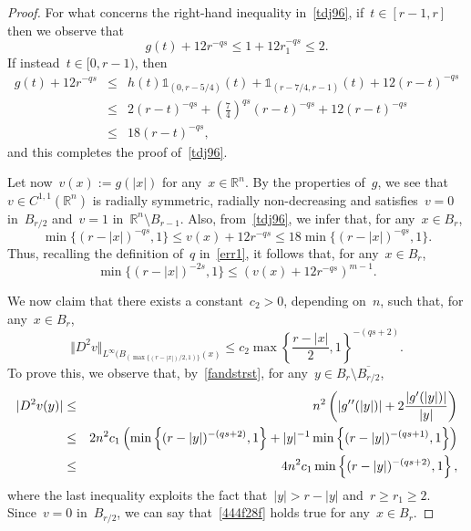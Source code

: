 \documentclass[10pt,a4paper]{amsart}
\numberwithin{equation}{section}
\newcommand{\R}{\mathbb{R}}
\begin{document}
\begin{proof}
For what concerns the right-hand inequality in~\eqref{tdj96}, if~$t \in[r-1,r]$ then we observe that
$$
g(t)+12r^{-qs} \leq 1+12 r_1^{-qs} \leq 2.
$$
If instead~$t \in[0,r-1)$, then
\begin{eqnarray*}
g(t) + 12 r^{-qs}&\leq & h(t) \mathds{1}_{(0,r-5/4)}(t) + \mathds{1}_{(r-7/4,r-1)}(t) +12 (r-t)^{-qs}\\
&\leq & 2 (r-t)^{-qs} +\left(\frac{7}{4}\right)^{qs} (r-t)^{-qs} +12 (r-t)^{-qs}\\
&\leq & 18 (r-t)^{-qs},
\end{eqnarray*}
and this completes the proof of~\eqref{tdj96}.

Let now~$v(x):= g(|x |)$ for any~$x \in \R^n$. By the properties of~$g$, we see that~$v \in C^{1,1}(\R^n)$ is radially symmetric, radially non-decreasing and satisfies~$v=0$ in~$B_{r/2}$ and~$v=1$ in~$\R^n \setminus B_{r-1}$. Also, from~\eqref{tdj96}, we infer that, for any~$x \in B_r$,
\begin{equation}\label{rtrc444}
\min\{(r-|x |)^{-qs},1 \} \leq v(x) + 12 r^{-qs} \leq 18  \min \{(r-|x |)^{-qs},1\} .
\end{equation}
Thus, recalling the definition of~$q$ in~\eqref{err1}, it follows that, for any~$x \in B_r$,
\begin{equation}\label{rtgy96}
\min\{(r-|x |)^{-2s},1 \} \leq ( v(x) + 12 r^{-qs} )^{m-1}.
\end{equation}

We now claim that there exists a constant~$c_2>0$, depending on~$n$, such that, for any~$x \in B_r$,
\begin{equation}\label{rtbtg3}
\Vert D^2 v \Vert_{L^{\infty}(B_{(\max\{(r-| x |)/2,1)\}}(x)} \leq c_2 \max \left\{ \frac{r -|x |}{2},1\right\}^{-(qs+2)}.
\end{equation}
To prove this, we observe that, by~\eqref{fandstrst}, for any~$y \in B_r \setminus \overline{B_{r/2}}$,
\begin{eqnarray}\label{444f28f}
| D^2 v(y) | &\leq & n^2 \left( |g\rq{}\rq{}(|y|)|+ 2 \frac{|g\rq{}(|y |)|}{|y |}\right) \notag\\
&\leq & 2n^2 c_1 \left( \min\left\{ (r-| y |)^{-(qs+2)},1 \right\} +| y |^{-1}\min\left\{ (r-|y |)^{-(qs+1)},1 \right\} \right) \notag\\
&\leq & 4n^2 c_1 \min\left\{ (r-|y |)^{-(qs+2)},1 \right\} ,
\end{eqnarray}
where the last inequality exploits the fact that~$|y | > r - |y |$ and~$r \geq r_1 \geq 2$.
Since~$v=0$ in~$B_{r/2}$, we can say that~\eqref{444f28f}
holds true for any~$x\in B_r$.


\end{proof}
\end{document}
